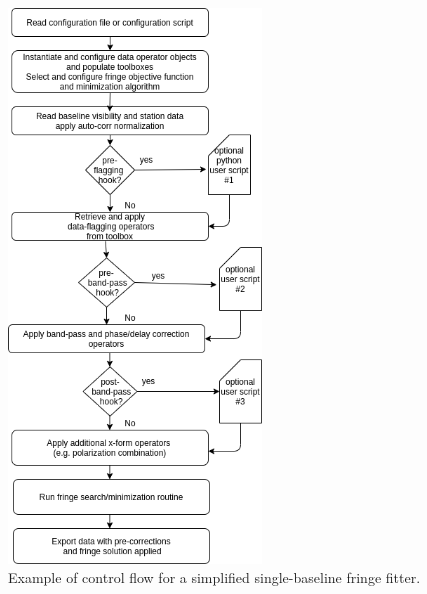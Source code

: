 \documentclass[hidelinks]{article}
\begin{document}
\begin{figure}[h!]
\begin{center}
  \includegraphics[width=0.6\textwidth]{./example-single-baseline-fringe-fitter.png}
    \caption{Example of control flow for a simplified single-baseline fringe fitter.}
    \label{fig:fringe-fitter}
\end{center}
\end{figure}


%
%
\newpage
\addtocounter{section}{1}
\renewcommand{\refname}{\thesection. References}
%
\end{document}
